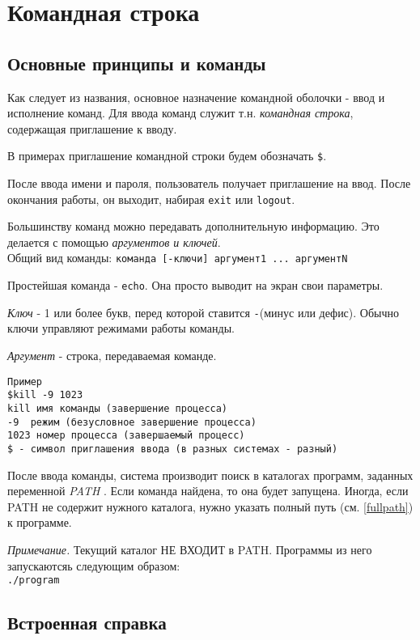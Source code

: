 \chapter{Командная строка}

\section{Основные принципы и команды}

Как следует из названия, основное назначение командной оболочки - ввод и исполнение команд. Для ввода команд служит т.н. \emph{командная строка}, содержащая приглашение к вводу.

В примерах приглашение командной строки будем обозначать \verb+$+.

После ввода имени и пароля, пользователь получает приглашение на ввод. После окончания работы, он выходит, набирая \verb+exit+ или \verb+logout+. 

Большинству команд можно передавать дополнительную информацию. Это делается с помощью \emph{аргументов и ключей}.\\
Общий вид команды:
\verb+команда [-ключи] аргумент1 ... аргументN+

Простейшая команда - \verb+echo+. Она просто выводит на экран свои параметры.

\emph{Ключ} - 1 или более букв, перед которой ставится \verb+-+(минус или дефис). Обычно ключи управляют режимами работы команды.

\emph{Аргумент} - строка, передаваемая команде.
\begin{verbatim}
Пример 
$kill -9 1023
kill имя команды (завершение процесса)
-9  режим (безусловное завершение процесса)
1023 номер процесса (завершаемый процесс) 
$ - символ приглашения ввода (в разных системах - разный)
\end{verbatim}

После ввода команды, система производит поиск в каталогах программ, заданных переменной \emph{PATH} \label{path}. Если команда найдена, то она будет запущена. Иногда, если PATH не содержит нужного каталога, нужно указать полный путь (см. \ref{fullpath}) к программе.

\emph{Примечание.} Текущий каталог НЕ ВХОДИТ в PATH. Программы из него запускаютсяь следующим образом:\\
\verb+./program+
 
\section{Встроенная справка}

